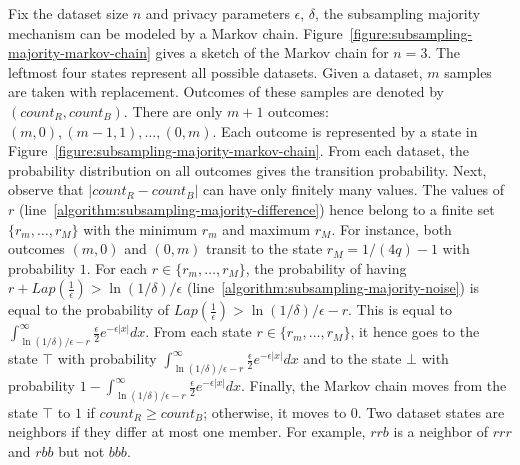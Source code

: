 Fix the dataset size $n$ and privacy parameters $\epsilon$, $\delta$,
the subsampling majority mechanism can be modeled by a Markov chain.
Figure~\ref{figure:subsampling-majority-markov-chain} gives a sketch
of the Markov chain for $n = 3$. The leftmost four states represent
all possible datasets. Given a dataset, $m$ samples are taken with
replacement. Outcomes of these samples are denoted by
$(\mathit{count}_R, \mathit{count}_B)$. There are only $m + 1$
outcomes: $(m, 0), (m - 1, 1), \ldots, (0, m)$. Each outcome is
represented by a state in
Figure~\ref{figure:subsampling-majority-markov-chain}. From each
dataset, the probability distribution on all outcomes gives the
transition probability. Next, observe that  $|
\mathit{count}_R - \mathit{count}_B |$ can have only finitely many
values. The values of $r$ 
(line~\ref{algorithm:subsampling-majority-difference}) hence belong to
a finite set $\{ r_m, \ldots, r_M \}$ with the minimum $r_m$ and
maximum $r_M$. 
For instance,
both outcomes $(m, 0)$ and $(0, m)$ transit to the state $r_M = 1/(4q)
- 1$ with probability $1$. For each $r \in \{ r_m, \ldots, r_M \}$,
the probability of having $r + \mathit{Lap}(\frac{1}{\epsilon}) > \ln
(1/\delta)/\epsilon$ (line~\ref{algorithm:subsampling-majority-noise})
is equal to the probability of $\mathit{Lap}(\frac{1}{\epsilon}) > \ln
(1/\delta)/\epsilon - r$. This is equal to $\int^{\infty}_{\ln
  (1/\delta)/\epsilon - r} \frac{\epsilon}{2}e^{-\epsilon|x|} dx$.
From each state $r \in \{ r_m, \ldots, r_M \}$, it hence goes to the state
$\top$ with probability $\int^{\infty}_{\ln (1/\delta)/\epsilon - r}
\frac{\epsilon}{2}e^{-\epsilon|x|} dx$ and to the state $\bot$ with
probability $1 - \int^{\infty}_{\ln (1/\delta)/\epsilon - r}
\frac{\epsilon}{2}e^{-\epsilon|x|} dx$. Finally, the
Markov chain moves from the state $\top$ to $1$ if
$\mathit{count}_R \geq \mathit{count}_B$; 
otherwise, it moves to $0$. Two dataset states are neighbors if they
differ at most one member. For example, $rrb$ is a neighbor
of $rrr$ and $rbb$ but not $bbb$.


